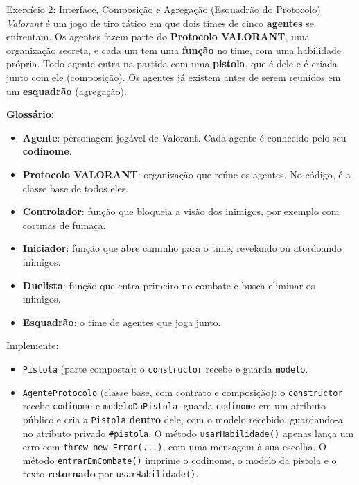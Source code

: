 \begin{exercicio}{Exercício 2: Interface, Composição e Agregação (Esquadrão do Protocolo)}
\textit{Valorant} é um jogo de tiro tático em que dois times de cinco \textbf{agentes} se
enfrentam. Os agentes fazem parte do \textbf{Protocolo VALORANT}, uma organização secreta, e
cada um tem uma \textbf{função} no time, com uma habilidade própria. Todo agente entra na
partida com uma \textbf{pistola}, que é dele e é criada junto com ele (composição). Os agentes
já existem antes de serem reunidos em um \textbf{esquadrão} (agregação).

\textbf{Glossário:}
\begin{itemize}
    \item \textbf{Agente}: personagem jogável de Valorant. Cada agente é conhecido pelo seu
    \textbf{codinome}.
    \item \textbf{Protocolo VALORANT}: organização que reúne os agentes. No código, é a classe
    base de todos eles.
    \item \textbf{Controlador}: função que bloqueia a visão dos inimigos, por exemplo com
    cortinas de fumaça.
    \item \textbf{Iniciador}: função que abre caminho para o time, revelando ou atordoando
    inimigos.
    \item \textbf{Duelista}: função que entra primeiro no combate e busca eliminar os inimigos.
    \item \textbf{Esquadrão}: o time de agentes que joga junto.
\end{itemize}

Implemente:

\begin{itemize}
    \item \texttt{Pistola} (parte composta): o \texttt{constructor} recebe e guarda
    \texttt{modelo}.

    \item \texttt{AgenteProtocolo} (classe base, com contrato e composição): o
    \texttt{constructor} recebe \texttt{codinome} e \texttt{modeloDaPistola}, guarda
    \texttt{codinome} em um atributo público e cria a \texttt{Pistola} \textbf{dentro} dele, com
    o modelo recebido, guardando-a no atributo privado \texttt{\#pistola}. O método
    \texttt{usarHabilidade()} apenas lança um erro com \texttt{throw new Error(...)}, com uma
    mensagem à sua escolha. O método \texttt{entrarEmCombate()} imprime o codinome, o modelo da
    pistola e o texto \textbf{retornado} por \texttt{usarHabilidade()}.


\end{itemize}
\end{exercicio}
